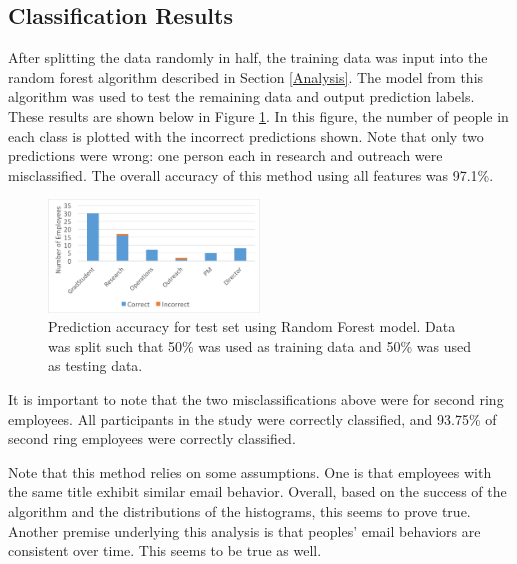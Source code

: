 \documentclass{article}
\begin{document}
\subsection{Classification Results}
After splitting the data randomly in half, the training data was input into the random forest algorithm described in Section \ref{Analysis}.  The model from this algorithm was used to test the remaining data and output prediction labels.  These results are shown below in Figure \ref{fig:result_hist}.  In this figure, the number of people in each class is plotted with the incorrect predictions shown.  Note that only two predictions were wrong: one person each in research and outreach were misclassified.  The overall accuracy of this method using all features was 97.1\%.
\begin{figure}[H]
    \centering
        \includegraphics[width=0.5\textwidth]{Prediction_50_50_RF}
        \caption{Prediction accuracy for test set using Random Forest model.  Data was split such that 50\% was used as training data and 50\% was used as testing data.}
        \label{fig:result_hist}
\end{figure}
It is important to note that the two misclassifications above were for second ring employees.  All participants in the study were correctly classified, and 93.75\% of second ring employees were correctly classified.  

Note that this method relies on some assumptions.  One is that employees with the same title exhibit similar email behavior.  Overall, based on the success of the algorithm and the distributions of the histograms, this seems to prove true.  Another premise underlying this analysis is that peoples' email behaviors are consistent over time.  This seems to be true as well.
\end{document}
